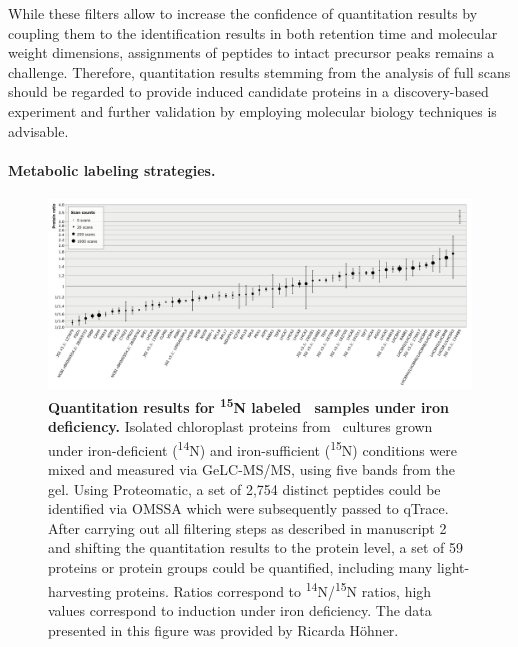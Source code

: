 While these filters allow to increase the confidence of quantitation results
by coupling them to the identification results in both retention time and
molecular weight dimensions, assignments of peptides to intact precursor
peaks remains a challenge.
Therefore, quantitation results stemming from the analysis of full scans
should be regarded to provide induced candidate proteins in a discovery-based
experiment and further validation by employing molecular biology techniques
is advisable.

\paragraph{Metabolic labeling strategies.}

\begin{figure}
\includegraphics[width=\textwidth]{figures/qtrace-diagram.jpg}
\caption{
{\bf Quantitation results for \textsuperscript{15}N labeled \cre~samples
    under iron deficiency.} 
    Isolated chloroplast proteins from \cre~cultures grown under 
    iron-deficient (\textsuperscript{14}N) and iron-sufficient
    (\textsuperscript{15}N) conditions were mixed and measured via
    GeLC-MS/MS, using five bands from the gel.
    Using Proteomatic, a set of 2,754 distinct peptides could be identified
    via OMSSA which were subsequently passed to qTrace. 
    After carrying out all filtering steps as described in manuscript 2
    and shifting the quantitation results to the protein level,
    a set of 59 proteins or protein groups could be quantified,
    including many light-harvesting proteins.
    Ratios correspond to \textsuperscript{14}N/\textsuperscript{15}N ratios,
    high values correspond to induction under iron deficiency.
    The data presented in this figure was provided by Ricarda H\"ohner.
}
\label{fig:qtrace-15n}
\end{figure}

